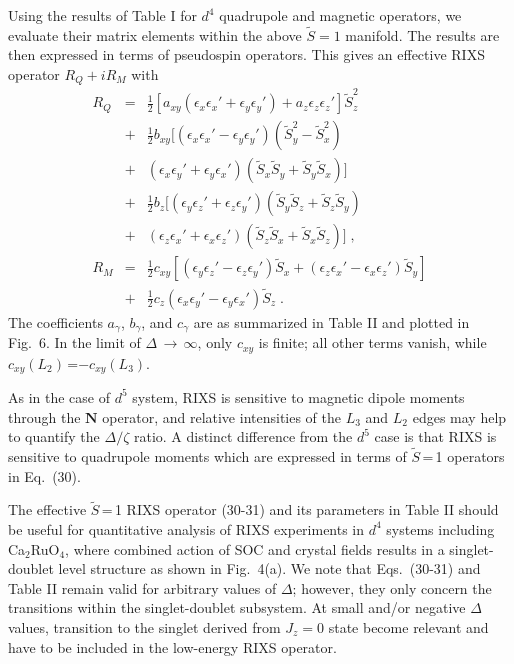 \documentclass[twocolumn,prb,aps,showpacs,superscriptaddress]{revtex4-1}
\begin{document}
Using the results of Table I for $d^4$ quadrupole and magnetic operators, 
we evaluate their matrix elements within the above $\tilde{S}=1$ manifold.  
The results are then expressed in terms of pseudospin operators. This gives 
an effective RIXS operator $R_Q+iR_M$ with 
\begin{eqnarray}
R_{Q}&=&\tfrac{1}{2}[a_{xy}(\epsilon_x \epsilon_x'+\epsilon_y \epsilon_y')+
a_z \epsilon_z \epsilon_z' ]\tilde{S}_z^2\nonumber\\
 &+&\tfrac{1}{2}b_{xy}[(\epsilon_x \epsilon_x'-\epsilon_y \epsilon_y') 
(\tilde{S}_y^2-\tilde{S}_x^2)\nonumber\\
&+& (\epsilon_x\epsilon_y'+\epsilon_y \epsilon_x')
(\tilde{S}_x\tilde{S}_y+\tilde{S}_y\tilde{S}_x)]\nonumber\\
&+&\tfrac{1}{2}b_z[(\epsilon_y \epsilon_z'+\epsilon_z \epsilon_y')
(\tilde{S}_y\tilde{S}_z+\tilde{S}_z\tilde{S}_y)\nonumber\\
&+& (\epsilon_z \epsilon_x'+\epsilon_x \epsilon_z')
(\tilde{S}_z\tilde{S}_x+\tilde{S}_x\tilde{S}_z)]\;, \\
R_{M}&=&\tfrac{1}{2}c_{xy}[(\epsilon_y\epsilon_z'-\epsilon_z\epsilon_y')
\tilde{S}_x+(\epsilon_z\epsilon_x'-\epsilon_x\epsilon_z')\tilde{S}_y]\nonumber\\
 &+&\tfrac{1}{2}c_z(\epsilon_x\epsilon_y'-\epsilon_y\epsilon_x')
\tilde{S}_{z}\;.
\end{eqnarray}
The coefficients $a_\gamma$, $b_\gamma$, and $c_\gamma$ are as summarized 
in Table II and plotted in Fig.~6. In the limit of 
$\Delta$\,$\rightarrow$\,$\infty$, only $c_{xy}$ is finite; all other 
terms vanish, while $c_{xy}(L_2)$\,=$-c_{xy}(L_3)$. 

As in the case of $d^5$ system, RIXS is sensitive to magnetic dipole moments
through the $\mathbf{N}$ operator, and relative intensities of the $L_3$ and 
$L_2$ edges may help to quantify the $\Delta/\zeta$ ratio. A distinct 
difference from the $d^5$ case is that RIXS is sensitive to quadrupole moments 
which are expressed in terms of $\tilde{S}$\,=\,1 operators in Eq.~(30). 

The effective $\tilde{S}$\,=\,1 RIXS operator (30-31) and its parameters in 
Table II should be useful for quantitative analysis of RIXS experiments in 
$d^4$ systems including Ca$_2$RuO$_4$, where combined action of SOC and crystal
fields results in a singlet-doublet level structure as shown in Fig.~4(a). 
We note that Eqs.~(30-31) and Table II remain valid for arbitrary values of 
$\Delta$; however, they only concern the transitions within the singlet-doublet
subsystem. At small and/or negative $\Delta$ values, transition to the singlet 
derived from $J_z=0$ state become relevant and have to be included in the 
low-energy RIXS operator.   
\end{document}
